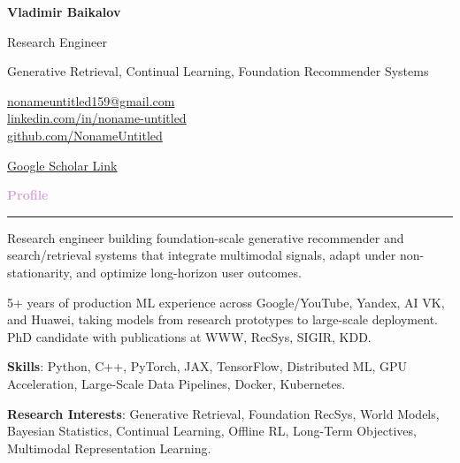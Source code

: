 \documentclass[12pt,a4paper]{extarticle}
\author{Vladimir Baikalov}
\newcommand{\cvsection}[1]{%
    \vspace{1mm}
    \par\noindent\hbox{\Large{\textcolor{Plum}
    {\textbf{#1}}}}\vspace{2mm}\hrule\vspace{2mm}
}
\begin{document}
\noindent
\begin{minipage}[c]{0.65\linewidth}
\Huge\textbf{Vladimir Baikalov}

\small{Research Engineer}

\small{Generative Retrieval, Continual Learning, Foundation Recommender Systems}

\end{minipage}
\begin{minipage}[c]{0.35\linewidth}
\raggedleft

\href{mailto:nonameuntitled159@gmail.com}{nonameuntitled159@gmail.com}\\

\href{https://www.linkedin.com/in/noname-untitled}{linkedin.com/in/noname-untitled}\\

\href{http://www.github.com/NonameUntitled}{github.com/NonameUntitled}

\href{https://scholar.google.com/citations?user=VNlOjZEAAAAJ}{\underline{Google Scholar Link}}

\end{minipage}

\vspace{2mm}

\cvsection{Profile}

Research engineer building foundation-scale generative recommender and search/retrieval systems that integrate multimodal signals, adapt under non-stationarity, and optimize long-horizon user outcomes.

\vspace{2mm}

5+ years of production ML experience across Google/YouTube, Yandex, AI VK, and Huawei, taking models from research prototypes to large-scale deployment. PhD candidate with publications at WWW, RecSys, SIGIR, KDD.

\vspace{2mm}

\textbf{Skills}: Python, C++, PyTorch, JAX, TensorFlow, Distributed ML, GPU Acceleration, Large-Scale Data Pipelines, Docker, Kubernetes.

\vspace{2mm}

\textbf{Research Interests}: Generative Retrieval, Foundation RecSys, World Models, Bayesian Statistics, Continual Learning, Offline RL, Long-Term Objectives, Multimodal Representation Learning.

\vspace{1mm}
\end{document}
